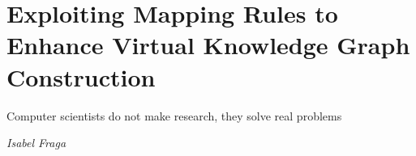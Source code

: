 
\chapter{Exploiting Mapping Rules to Enhance Virtual Knowledge Graph Construction}
\label{chapter:virtual}
\epigraph{Computer scientists do not make research, they solve real problems}{\textit{Isabel Fraga}}



